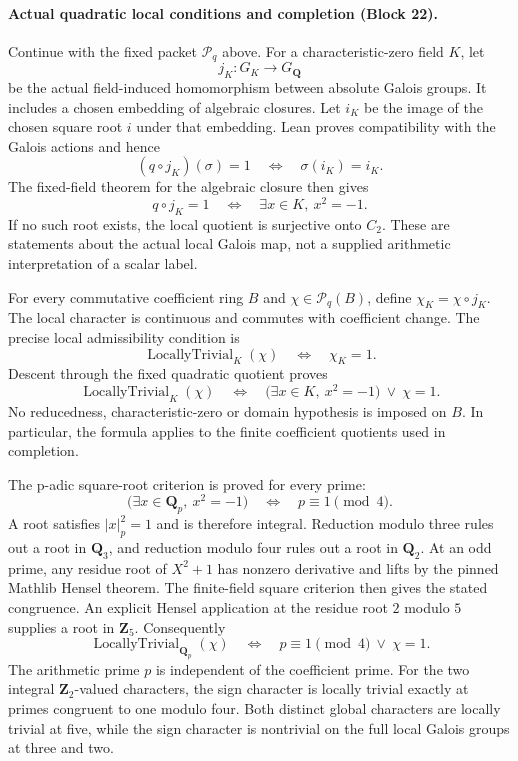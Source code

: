 \documentclass[11pt]{article}
\theoremstyle{definition}
\theoremstyle{remark}
\newcommand{\Z}{\mathbf Z}
\newcommand{\Q}{\mathbf Q}
\begin{document}
\paragraph{Actual quadratic local conditions and completion (Block 22).}
Continue with the fixed packet $\mathcal P_q$ above. For a
characteristic-zero field $K$, let
\[
j_K:G_K\longrightarrow G_{\Q}
\]
be the actual field-induced homomorphism between absolute Galois groups.
It includes a chosen embedding of algebraic closures. Let $i_K$ be the
image of the chosen square root $i$ under that embedding. Lean proves
compatibility with the Galois actions and hence
\[
(q\circ j_K)(\sigma)=1
\quad\Longleftrightarrow\quad \sigma(i_K)=i_K.
\]
The fixed-field theorem for the algebraic closure then gives
\[
q\circ j_K=1
\quad\Longleftrightarrow\quad
\exists x\in K,\ x^2=-1.
\]
If no such root exists, the local quotient is surjective onto $C_2$.
These are statements about the actual local Galois map, not a supplied
arithmetic interpretation of a scalar label.

For every commutative coefficient ring $B$ and $\chi\in\mathcal P_q(B)$,
define $\chi_K=\chi\circ j_K$. The local character is continuous and
commutes with coefficient change. The precise local admissibility
condition is
\[
\operatorname{LocallyTrivial}_K(\chi)
\quad\Longleftrightarrow\quad \chi_K=1.
\]
Descent through the fixed quadratic quotient proves
\[
\operatorname{LocallyTrivial}_K(\chi)
\quad\Longleftrightarrow\quad
\bigl(\exists x\in K,\ x^2=-1\bigr)\ \lor\ \chi=1.
\]
No reducedness, characteristic-zero or domain hypothesis is imposed on
$B$. In particular, the formula applies to the finite coefficient
quotients used in completion.

The p-adic square-root criterion is proved for every prime:
\[
\bigl(\exists x\in\Q_p,\ x^2=-1\bigr)
\quad\Longleftrightarrow\quad p\equiv1\pmod4.
\]
A root satisfies $\lvert x\rvert_p^2=1$ and is therefore integral.
Reduction modulo three rules out a root in $\Q_3$, and reduction modulo
four rules out a root in $\Q_2$. At an odd prime, any residue root of
$X^2+1$ has nonzero derivative and lifts by the pinned Mathlib Hensel
theorem. The finite-field square criterion then gives the stated
congruence. An explicit Hensel application at the residue root $2$ modulo $5$ supplies
a root in $\Z_5$. Consequently
\[
\boxed{
\operatorname{LocallyTrivial}_{\Q_p}(\chi)
\quad\Longleftrightarrow\quad p\equiv1\pmod4\ \lor\ \chi=1.
}
\]
The arithmetic prime $p$ is independent of the coefficient prime. For
the two integral $\Z_2$-valued characters, the sign character is locally
trivial exactly at primes congruent to one modulo four. Both distinct
global characters are locally trivial at five, while the sign character
is nontrivial on the full local Galois groups at three and two.
\end{document}
